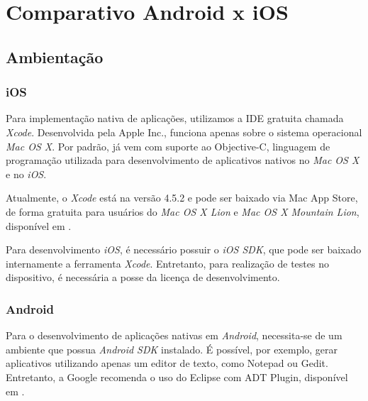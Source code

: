     \chapter{Comparativo Android x iOS} \label{CHP:COMP}%
    \section {Ambientação}
     
    \subsection{iOS}
    
	Para implementação nativa de aplicações, utilizamos a \ac{IDE} gratuita chamada \emph{Xcode}. Desenvolvida pela Apple Inc., funciona apenas sobre o sistema operacional \emph{Mac OS X}.  Por padrão, já vem com suporte ao Objective-C, linguagem de programação utilizada para desenvolvimento de aplicativos nativos no \emph{Mac OS X} e no \emph{iOS}.
    
	Atualmente, o \emph{Xcode} está na versão 4.5.2 e pode ser baixado via Mac App Store, de forma gratuita para usuários do \emph{Mac OS X Lion} e \emph{Mac OS X Mountain Lion}, disponível em \cite{xcode}.
    
	Para desenvolvimento \emph{iOS}, é necessário possuir o \emph{iOS SDK}, que pode ser baixado internamente a ferramenta \emph{Xcode}. Entretanto, para realização de testes no dispositivo, é necessária a posse da licença de desenvolvimento.
     
    \subsection{Android}
           
		    Para o desenvolvimento de aplicações nativas em \emph{Android}, necessita-se de um ambiente que possua \emph{Android SDK} instalado. É possível, por exemplo, gerar aplicativos utilizando apenas um editor de texto, como Notepad ou Gedit. Entretanto, a Google recomenda o uso do Eclipse com ADT Plugin, disponível em \cite{adt}.
           
     
     
